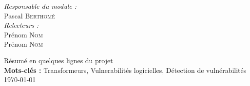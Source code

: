 \begin{titlepage}
\begin{center}
\begin{minipage}{0.4\textwidth}
\begin{flushleft}
            \end{flushleft}
        \end{minipage}
        \begin{minipage}{0.4\textwidth}
            \begin{flushright} \large
                \emph{Responsable du module :} \\
                Pascal \textsc{Berthomé}\\
                \emph{Relecteurs :} \\
                Prénom \textsc{Nom}\\
                Prénom \textsc{Nom}\\
            \end{flushright}
        \end{minipage}
        \vfill
        Résumé en quelques lignes du projet\\
        \textbf{Mots-clés :} Transformeurs, Vulnerabilités logicielles, Détection de
    vulnérabilités\\
        \vfill
        {\large \today}
    \end{center}
\end{titlepage}